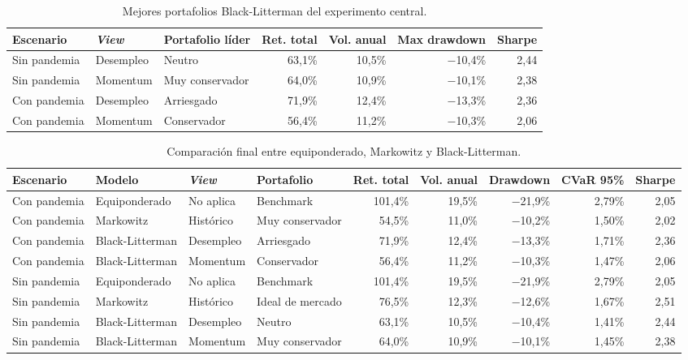 \begin{table}[H]
\centering
\caption{Mejores portafolios Black-Litterman del experimento central.}
\label{tab:anexo4_bl_mejores}
\scriptsize
\begin{adjustbox}{max width=\textwidth}
\begin{tabular}{@{}lllrrrr@{}}
\toprule
Escenario & \textit{View} & Portafolio l\'ider & Ret. total & Vol. anual & Max drawdown & Sharpe \\
\midrule
Sin pandemia & Desempleo & Neutro & 63,1\% & 10,5\% & $-$10,4\% & 2,44 \\
Sin pandemia & Momentum & Muy conservador & 64,0\% & 10,9\% & $-$10,1\% & 2,38 \\
Con pandemia & Desempleo & Arriesgado & 71,9\% & 12,4\% & $-$13,3\% & 2,36 \\
Con pandemia & Momentum & Conservador & 56,4\% & 11,2\% & $-$10,3\% & 2,06 \\
\bottomrule
\end{tabular}
\end{adjustbox}
\end{table}

\begin{table}[H]
\centering
\caption{Comparaci\'on final entre equiponderado, Markowitz y Black-Litterman.}
\label{tab:anexo4_bl_comparacion_final}
\scriptsize
\begin{adjustbox}{max width=\textwidth}
\begin{tabular}{@{}llllrrrrr@{}}
\toprule
Escenario & Modelo & \textit{View} & Portafolio & Ret. total & Vol. anual & Drawdown & CVaR 95\% & Sharpe \\
\midrule
Con pandemia & Equiponderado & No aplica & Benchmark & 101,4\% & 19,5\% & $-$21,9\% & 2,79\% & 2,05 \\
Con pandemia & Markowitz & Hist\'orico & Muy conservador & 54,5\% & 11,0\% & $-$10,2\% & 1,50\% & 2,02 \\
Con pandemia & Black-Litterman & Desempleo & Arriesgado & 71,9\% & 12,4\% & $-$13,3\% & 1,71\% & 2,36 \\
Con pandemia & Black-Litterman & Momentum & Conservador & 56,4\% & 11,2\% & $-$10,3\% & 1,47\% & 2,06 \\
Sin pandemia & Equiponderado & No aplica & Benchmark & 101,4\% & 19,5\% & $-$21,9\% & 2,79\% & 2,05 \\
Sin pandemia & Markowitz & Hist\'orico & Ideal de mercado & 76,5\% & 12,3\% & $-$12,6\% & 1,67\% & 2,51 \\
Sin pandemia & Black-Litterman & Desempleo & Neutro & 63,1\% & 10,5\% & $-$10,4\% & 1,41\% & 2,44 \\
Sin pandemia & Black-Litterman & Momentum & Muy conservador & 64,0\% & 10,9\% & $-$10,1\% & 1,45\% & 2,38 \\
\bottomrule
\end{tabular}
\end{adjustbox}
\end{table}

